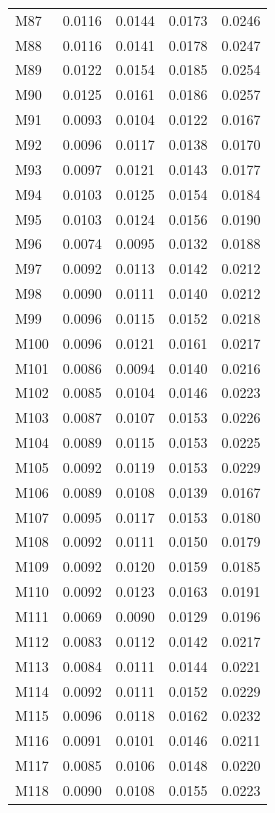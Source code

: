 \begin{longtable}{lrrrr}
M87 & 0.0116 & 0.0144 & 0.0173 & 0.0246 \\
M88 & 0.0116 & 0.0141 & 0.0178 & 0.0247 \\
M89 & 0.0122 & 0.0154 & 0.0185 & 0.0254 \\
M90 & 0.0125 & 0.0161 & 0.0186 & 0.0257 \\
M91 & 0.0093 & 0.0104 & 0.0122 & 0.0167 \\
M92 & 0.0096 & 0.0117 & 0.0138 & 0.0170 \\
M93 & 0.0097 & 0.0121 & 0.0143 & 0.0177 \\
M94 & 0.0103 & 0.0125 & 0.0154 & 0.0184 \\
M95 & 0.0103 & 0.0124 & 0.0156 & 0.0190 \\
M96 & 0.0074 & 0.0095 & 0.0132 & 0.0188 \\
M97 & 0.0092 & 0.0113 & 0.0142 & 0.0212 \\
M98 & 0.0090 & 0.0111 & 0.0140 & 0.0212 \\
M99 & 0.0096 & 0.0115 & 0.0152 & 0.0218 \\
M100 & 0.0096 & 0.0121 & 0.0161 & 0.0217 \\
M101 & 0.0086 & 0.0094 & 0.0140 & 0.0216 \\
M102 & 0.0085 & 0.0104 & 0.0146 & 0.0223 \\
M103 & 0.0087 & 0.0107 & 0.0153 & 0.0226 \\
M104 & 0.0089 & 0.0115 & 0.0153 & 0.0225 \\
M105 & 0.0092 & 0.0119 & 0.0153 & 0.0229 \\
M106 & 0.0089 & 0.0108 & 0.0139 & 0.0167 \\
M107 & 0.0095 & 0.0117 & 0.0153 & 0.0180 \\
M108 & 0.0092 & 0.0111 & 0.0150 & 0.0179 \\
M109 & 0.0092 & 0.0120 & 0.0159 & 0.0185 \\
M110 & 0.0092 & 0.0123 & 0.0163 & 0.0191 \\
M111 & 0.0069 & 0.0090 & 0.0129 & 0.0196 \\
M112 & 0.0083 & 0.0112 & 0.0142 & 0.0217 \\
M113 & 0.0084 & 0.0111 & 0.0144 & 0.0221 \\
M114 & 0.0092 & 0.0111 & 0.0152 & 0.0229 \\
M115 & 0.0096 & 0.0118 & 0.0162 & 0.0232 \\
M116 & 0.0091 & 0.0101 & 0.0146 & 0.0211 \\
M117 & 0.0085 & 0.0106 & 0.0148 & 0.0220 \\
M118 & 0.0090 & 0.0108 & 0.0155 & 0.0223 \\

\end{longtable}
